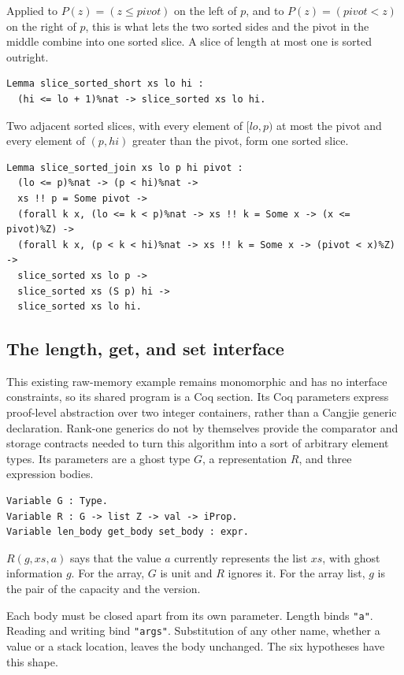 \documentclass[11pt]{article}
\begin{document}
Applied to \(P(z) = (z \le \mathit{pivot})\) on the left of \(p\), and to \(P(z) = (\mathit{pivot} < z)\) on the right of \(p\), this is what lets the two sorted sides and the pivot in the middle combine into one sorted slice.
A slice of length at most one is sorted outright.

\begin{lstlisting}
Lemma slice_sorted_short xs lo hi :
  (hi <= lo + 1)%nat -> slice_sorted xs lo hi.
\end{lstlisting}

Two adjacent sorted slices, with every element of \([lo, p)\) at most the pivot and every element of \((p, hi)\) greater than the pivot, form one sorted slice.

\begin{lstlisting}
Lemma slice_sorted_join xs lo p hi pivot :
  (lo <= p)%nat -> (p < hi)%nat ->
  xs !! p = Some pivot ->
  (forall k x, (lo <= k < p)%nat -> xs !! k = Some x -> (x <= pivot)%Z) ->
  (forall k x, (p < k < hi)%nat -> xs !! k = Some x -> (pivot < x)%Z) ->
  slice_sorted xs lo p ->
  slice_sorted xs (S p) hi ->
  slice_sorted xs lo hi.
\end{lstlisting}

\subsection{The length, get, and set interface}

This existing raw-memory example remains monomorphic and has no interface constraints, so its shared program is a Coq section.
Its Coq parameters express proof-level abstraction over two integer
containers, rather than a Cangjie generic declaration. Rank-one generics
do not by themselves provide the comparator and storage contracts needed
to turn this algorithm into a sort of arbitrary element types.
Its parameters are a ghost type \(G\), a representation \(R\), and three expression bodies.

\begin{lstlisting}
Variable G : Type.
Variable R : G -> list Z -> val -> iProp.
Variable len_body get_body set_body : expr.
\end{lstlisting}

\(R(g, xs, a)\) says that the value \(a\) currently represents the list \(xs\), with ghost information \(g\).
For the array, \(G\) is unit and \(R\) ignores it.
For the array list, \(g\) is the pair of the capacity and the version.

Each body must be closed apart from its own parameter.
Length binds \texttt{"a"}.
Reading and writing bind \texttt{"args"}.
Substitution of any other name, whether a value or a stack location, leaves the body unchanged.
The six hypotheses have this shape.
\end{document}

